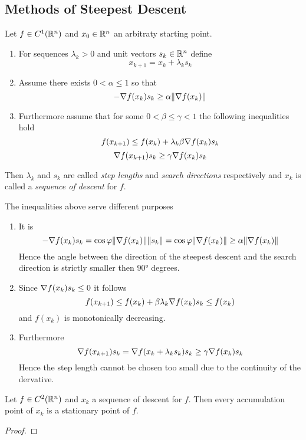 \subsection{Methods of Steepest Descent}
\bigskip


\begin{definition}
    Let \( f \in C^1(\mathbb{R}^n) \) and \( x_0 \in \mathbb{R}^n \) an arbitraty starting point.
    \begin{enumerate}
        \item For sequences \( \lambda_k > 0 \) and unit vectors \( s_k \in \mathbb{R}^n \) define
              \[
                  x_{k + 1} = x_k + \lambda_k s_k
              \]
        \item Assume there exists \( 0 < \alpha \le 1 \) so that
              \[
                  - \nabla f(x_k) s_k \ge \alpha \|\nabla f(x_k)\|
              \]
        \item Furthermore assume that for some \( 0 < \beta \le \gamma < 1 \) the following inequalities hold
              \[
                  f(x_{k + 1}) \le f(x_k) + \lambda_k \beta \nabla f(x_k) s_k
              \]
              \[
                  \nabla f(x_{k + 1}) s_k \ge \gamma \nabla f(x_k) s_k
              \]
    \end{enumerate}
    Then \( \lambda_k \) and  \( s_k \) are called \emph{step lengths} and \emph{search directions} respectively
    and \( x_k \) is called a \emph{sequence of descent} for \( f \).
\end{definition}
\bigskip


\begin{remarks}
    The inequalities above serve different purposes
    \begin{enumerate}
        \item  It is
              \[
                  - \nabla f(x_k) s_k = \cos\varphi \|\nabla f(x_k)\| \|s_k\| =
                  \cos\varphi \|\nabla f(x_k)\| \ge \alpha \|\nabla f(x_k)\|
              \]
              Hence the angle between the direction of the steepest descent and the search direction is
              strictly smaller then \( \ang{90} \) degrees.
        \item  Since \( \nabla f(x_k) s_k \le 0 \) it follows
              \[
                  f(x_{k + 1}) \le f(x_k) + \beta \lambda_k \nabla f(x_k) s_k \le f(x_k)
              \]
              and \( f(x_k) \) is monotonically decreasing.
        \item Furthermore
              \[
                  \nabla f(x_{k + 1}) s_k = \nabla f(x_k + \lambda_k s_k) s_k
                  \ge \gamma \nabla f(x_k) s_k
              \]
              Hence the step length cannot be chosen too small due to the continuity of the dervative.
    \end{enumerate}
\end{remarks}
\bigskip


\begin{theorem}\label{thm:steepest_descent}
    Let \( f \in C^2(\mathbb{R}^n) \) and \( x_k \) a sequence of descent for \( f \).
    Then every accumulation point of \( x_k \) is a stationary point of \( f \).
\end{theorem}

\begin{proof}
\end{proof}
